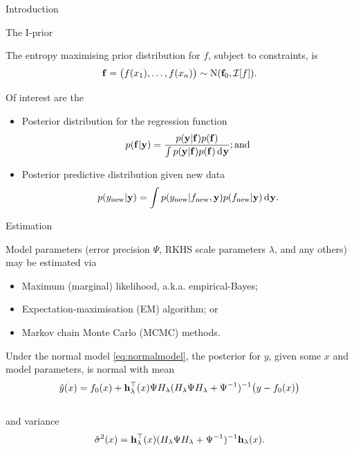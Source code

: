 \documentclass{beamer}
\newlength{\onecolwid}
\begin{document}
\begin{frame}[t]
\begin{columns}[t]
\begin{column}{\onecolwid}
\begin{block}{Introduction}
\begin{alertblock}{The I-prior}

The entropy maximising prior distribution for $f$, subject to constraints, is 
\[
  {\mathbf f} = \big(f(x_1),\dots,f(x_n) \big) \sim \operatorname{N} ({\mathbf f}_0, {\mathcal I}[f]).
\]

\vspace{10pt}

\end{alertblock}

\vspace{-10pt}
Of interest are the

\newcommand{\new}{{\text{new}}}
\begin{itemize}
  \item Posterior distribution for the regression function
  \[
    p({\mathbf f}|{\mathbf y}) = \frac{p({\mathbf y}|{\mathbf f}) p({\mathbf f})}{\int p({\mathbf y}|{\mathbf f}) p({\mathbf f}) \operatorname{d\!\:\!} {\mathbf y}}; \text{and}
  \]
  \item Posterior predictive distribution given new data
  \[
    p(y_\new|\by) = \int p(y_\new|f_\new,\by) p(f_\new|\by) \d \by.
  \]
\end{itemize}

\end{block}



\vspace{-20pt}
\begin{block}{Estimation}

Model parameters (error precision $\Psi$, RKHS scale parameters $\lambda$, and any others) may be estimated via

\begin{itemize}
  \item Maximum (marginal) likelihood, a.k.a. empirical-Bayes;
  \item Expectation-maximisation (EM) algorithm; or
  \item Markov chain Monte Carlo (MCMC) methods.
\end{itemize} 

Under the normal model \eqref{eq:normalmodel}, the posterior for $y$, given some $x$ and model parameters, is normal with mean
~\\[-20pt]
\[
  \hat y(x) = f_0(x) + {\mathbf h}_\lambda^\top(x) \Psi H_\lambda(H_\lambda \Psi H_\lambda + \Psi^{-1})^{-1}\big(y - f_0(x)\big)
\]
~\\[-20pt]
and variance
~\\[-20pt]
\[
  \hat\sigma^2(x) = {\mathbf h}_\lambda^\top(x) (H_\lambda \Psi H_\lambda + \Psi^{-1})^{-1} {\mathbf h}_\lambda(x).
\]


\end{block}
\end{column}
\end{columns}
\end{frame}
\end{document}
